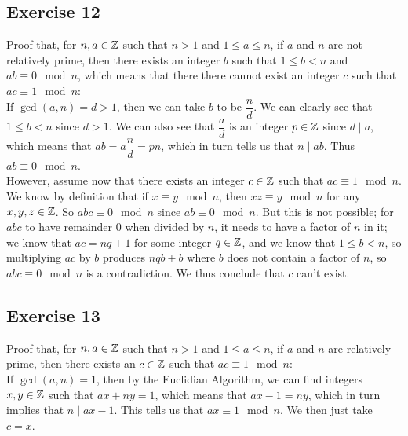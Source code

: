 \documentclass[12pt]{article}
\begin{document}
    \subsection*{Exercise 12}
    Proof that, for $n, a \in \mathbb{Z}$ such that $n > 1$
    and $1 \leqslant a \leqslant n$,
    if $a$ and $n$ are not relatively prime,
    then there exists an integer $b$ such that
    $1 \leqslant b < n$ and $ab \equiv 0 \mod n$,
    which means that there there cannot exist an integer $c$
    such that $ac \equiv 1 \mod n$: \\
    If $\gcd(a, n) = d > 1$,
    then we can take $b$ to be $\dfrac{n}{d}$.
    We can clearly see that $1 \leqslant b < n$
    since $d > 1$.
    We can also see that $\dfrac{a}{d}$ is an integer $p \in \mathbb{Z}$
    since $d \mid a$,
    which means that $ab = a\dfrac{n}{d} = pn$,
    which in turn tells us that $n \mid ab$.
    Thus $ab \equiv 0 \mod n$. \\
    However, assume now that there exists an integer $c \in \mathbb{Z}$
    such that $ac \equiv 1 \mod n$.
    We know by definition that if $x \equiv y \mod n$,
    then $xz \equiv y \mod n$ for any $x, y, z \in \mathbb{Z}$. 
    So $abc \equiv 0 \mod n$
    since $ab \equiv 0 \mod n$.
    But this is not possible;
    for $abc$ to have remainder $0$ when divided by $n$,
    it needs to have a factor of $n$ in it;
    we know that $ac = nq + 1$ for some integer $q \in \mathbb{Z}$,
    and we know that $1 \leqslant b < n$,
    so multiplying $ac$ by $b$
    produces $nqb + b$ where $b$ does not contain a factor of $n$,
    so $abc \equiv 0 \mod n$ is a contradiction.
    We thus conclude that $c$ can't exist. \\

    \subsection*{Exercise 13}
    Proof that, for $n, a \in \mathbb{Z}$ such that $n > 1$
    and $1 \leqslant a \leqslant n$,
    if $a$ and $n$ are relatively prime,
    then there exists an $c \in \mathbb{Z}$
    such that $ac \equiv 1 \mod n$: \\
    If $\gcd(a, n) = 1$,
    then by the Euclidian Algorithm, we can find integers $x, y \in \mathbb{Z}$
    such that $ax + ny = 1$,
    which means that $ax - 1 = ny$,
    which in turn implies that $n \mid ax - 1$.
    This tells us that $ax \equiv 1 \mod n$.
    We then just take $c = x$. \\
\end{document}

